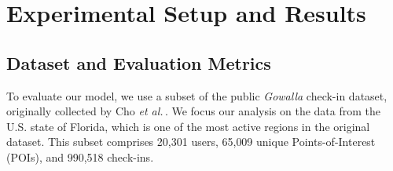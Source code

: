 \section{Experimental Setup and Results}
\label{sec:cbic:experiments}

\subsection{Dataset and Evaluation Metrics}
\label{sec:cbic:dataset}

To evaluate our model, we use a subset of the public \emph{Gowalla} check-in dataset, originally collected by Cho \textit{et al.}\,\cite{cho2011gowalla}. We focus our analysis on the data from the U.S. state of Florida, which is one of the most active regions in the original dataset. This subset comprises 20{,}301 users, 65{,}009 unique Points-of-Interest (POIs), and 990{,}518 check-ins.

